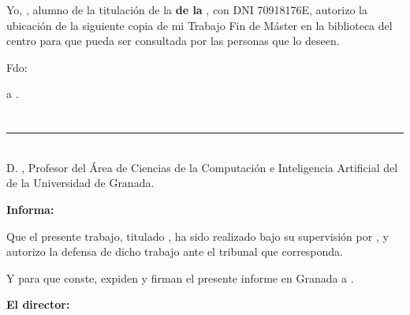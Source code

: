 Yo, \textbf{\myName}, alumno de la titulación \myDegree de la \textbf{\myFaculty de la \myUni}, con DNI 70918176E, autorizo la
ubicación de la siguiente copia de mi Trabajo Fin de Máster en la biblioteca del centro para que pueda ser
consultada por las personas que lo deseen.

\vspace{6cm}

\noindent Fdo: \myName

\vspace{2cm}

\begin{flushright}
\myLocation a \myTime.
\end{flushright}


\chapter*{}
\thispagestyle{empty}

\noindent\rule[-1ex]{\textwidth}{2pt}\\[4.5ex]

D. \textbf{\myProf}, Profesor del Área de Ciencias de la Computación e Inteligencia Artificial del \myDepartment
 de la Universidad de Granada.

\vspace{0.5cm}

\textbf{Informa:}

\vspace{0.5cm}

Que el presente trabajo, titulado \textit{\textbf{\myTitle}},
ha sido realizado bajo su supervisión por \textbf{\myName}, y autorizo la defensa de dicho trabajo ante el tribunal
que corresponda.

\vspace{0.5cm}

Y para que conste, expiden y firman el presente informe en Granada a \myTime.

\vspace{1cm}

\textbf{El director:}

\vspace{5cm}

\noindent \textbf{\myProf }
%
%



